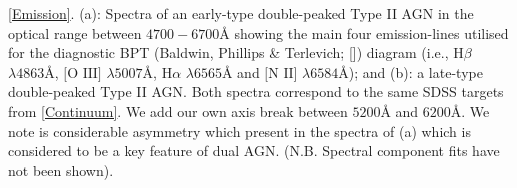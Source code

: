 \label{Emission} \ref{Emission}. (a): Spectra of an early-type double-peaked Type II AGN in the optical range between $4700-6700Å$ showing the main four emission-lines utilised for the diagnostic BPT (Baldwin, Phillips \& Terlevich; [\cite{Baldwin_1981}]) diagram (i.e., $\text{H}\beta$ $\lambda4863Å$, $\text{[O III]}$ $\lambda5007Å$, $\text{H}\alpha$ $\lambda6565Å$ and $\text{[N II]}$ $\lambda6584Å$); and (b): a late-type double-peaked Type II AGN. Both spectra correspond to the same SDSS targets from \ref{Continuum}. We add our own axis break between $5200Å$ and $6200Å$. We note is considerable asymmetry which present in the spectra of (a) which is considered to be a key feature of dual AGN. (N.B. Spectral component fits have not been shown).  
  